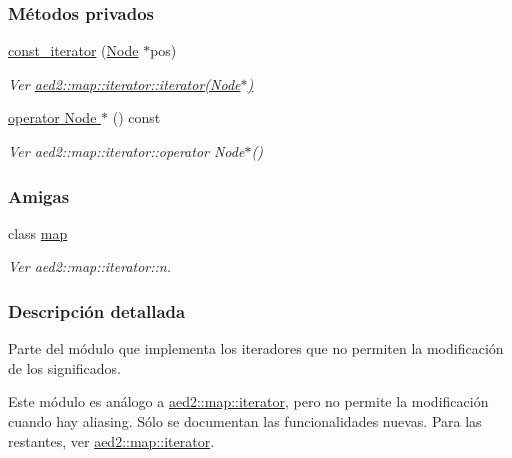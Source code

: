 \subsubsection*{\-Métodos privados}
\begin{DoxyCompactItemize}
\item 
\hyperlink{classaed2_1_1iterator_1_1const__iterator_a8ef6d37dab4cd4ccad630fd0fa6cf28a_a8ef6d37dab4cd4ccad630fd0fa6cf28a}{const\-\_\-iterator} (\hyperlink{structaed2_1_1iterator_1_1Node}{\-Node} $\ast$pos)
\begin{DoxyCompactList}\small\item\em \-Ver \hyperlink{classaed2_1_1map_1_1iterator_ab0ea21abcb32b6d5a72cf341b9029838_ab0ea21abcb32b6d5a72cf341b9029838}{aed2\-::map\-::iterator\-::iterator(\-Node$\ast$)} \end{DoxyCompactList}\item 
\hyperlink{classaed2_1_1iterator_1_1const__iterator_a6ce5576b1b7757fd477ae3d06a7a360e_a6ce5576b1b7757fd477ae3d06a7a360e}{operator Node $\ast$} () const 
\begin{DoxyCompactList}\small\item\em \-Ver aed2\-::map\-::iterator\-::operator \-Node$\ast$() \end{DoxyCompactList}\end{DoxyCompactItemize}
\subsubsection*{\-Amigas}
\begin{DoxyCompactItemize}
\item 
class \hyperlink{classaed2_1_1iterator_1_1const__iterator_aeda338414e516b47761f994fb78056c6_aeda338414e516b47761f994fb78056c6}{map}
\begin{DoxyCompactList}\small\item\em \-Ver aed2\-::map\-::iterator\-::n. \end{DoxyCompactList}\end{DoxyCompactItemize}


\subsubsection{\-Descripción detallada}
\-Parte del módulo que implementa los iteradores que no permiten la modificación de los significados. 

\-Este módulo es análogo a \hyperlink{classaed2_1_1map_1_1iterator}{aed2\-::map\-::iterator}, pero no permite la modificación cuando hay aliasing. \-Sólo se documentan las funcionalidades nuevas. \-Para las restantes, ver \hyperlink{classaed2_1_1map_1_1iterator}{aed2\-::map\-::iterator}. 

